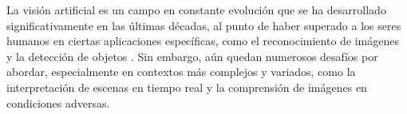 La visión artificial es un campo en constante evolución que se ha desarrollado significativamente
en las últimas décadas, al punto de haber superado a los seres humanos en
ciertas aplicaciones específicas, como el reconocimiento de imágenes \cite{5206848}
y la detección de objetos \cite{wang2022yolov7trainablebagoffreebiessets}. Sin
embargo, aún quedan numerosos desafíos por abordar, especialmente en contextos
más complejos y variados, como la interpretación de escenas en tiempo real y la comprensión
de imágenes en condiciones adversas.

\endinput
